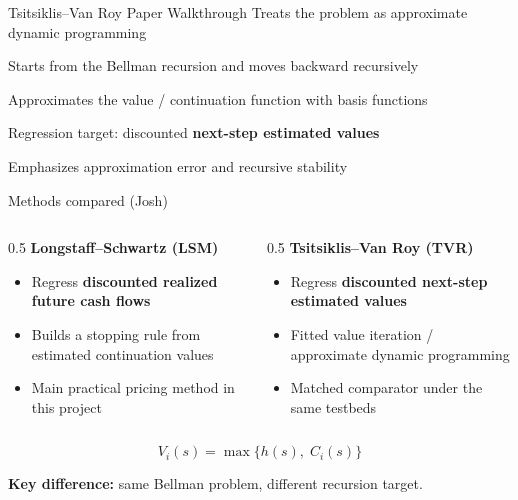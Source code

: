 \documentclass[
  11pt,
  ignorenonframetext,
  aspectratio=169,
]{beamer}
\providecommand{\tightlist}{%
  \setlength{\itemsep}{0pt}\setlength{\parskip}{0pt}}
\begin{document}
\begin{frame}{Tsitsiklis--Van Roy Paper Walkthrough}
\label{tsitsiklisvan-roy-paper-walkthrough}
Treats the problem as approximate dynamic programming

Starts from the Bellman recursion and moves backward recursively

Approximates the value / continuation function with basis functions

Regression target: discounted \textbf{next-step estimated values}

Emphasizes approximation error and recursive stability
\end{frame}

\begin{frame}{Methods compared (Josh)}
\label{methods-compared-josh}
\begin{columns}[T]
\begin{column}{0.5\linewidth}
\textbf{Longstaff--Schwartz (LSM)}

\begin{itemize}
\tightlist
\item
  Regress \textbf{discounted realized future cash flows}
\item
  Builds a stopping rule from estimated continuation values
\item
  Main practical pricing method in this project
\end{itemize}
\end{column}

\begin{column}{0.5\linewidth}
\textbf{Tsitsiklis--Van Roy (TVR)}

\begin{itemize}
\tightlist
\item
  Regress \textbf{discounted next-step estimated values}
\item
  Fitted value iteration / approximate dynamic programming
\item
  Matched comparator under the same testbeds
\end{itemize}
\end{column}
\end{columns}

\[
V_i(s)=\max\{h(s),\;C_i(s)\}
\]

\textbf{Key difference:} same Bellman problem, different recursion
target.
\end{frame}
\end{document}
